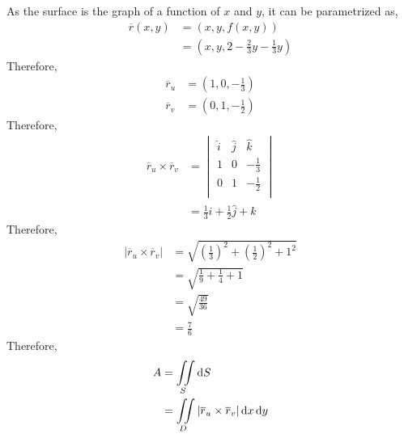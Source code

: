 \documentclass[fleqn, a4paper, 12pt, twoside]{article}
\theoremstyle{definition}
\theoremstyle{theorem}
\begin{document}
\begin{solution}
\begin{figure}[H]
	\end{figure}
	As the surface is the graph of a function of $x$ and $y$, it can be parametrized as,
	\begin{align*}
		\overline{r}(x,y) & = \left( x , y , f(x,y) \right)\\
                                  & = \left( x , y , 2 - \frac{2}{3} y - \frac{1}{3} y \right)
	\end{align*}
	Therefore,
	\begin{align*}
		\overline{r}_u & = \left( 1 , 0 , -\frac{1}{3} \right) \\
		\overline{r}_v & = \left( 0 , 1 , -\frac{1}{2} \right)
	\end{align*}
	Therefore,
	\begin{align*}
		\overline{r}_u \times \overline{r}_v &=
			\begin{vmatrix}
				\hat{i} & \hat{j} & \hat{k}      \\
				1       & 0       & -\frac{1}{3} \\
				0       & 1       & -\frac{1}{2} \\
			\end{vmatrix}\\
		&= \frac{1}{3} \hat{i} + \frac{1}{2} \hat{j} + \hat{k}
	\end{align*}
	Therefore,
	\begin{align*}
		\left| \overline{r}_u \times \overline{r}_v \right| & = \sqrt{\left( \frac{1}{3} \right)^2 + \left( \frac{1}{2} \right)^2 + 1^2} \\
                                                                    & = \sqrt{\frac{1}{9} + \frac{1}{4} + 1}                                     \\
                                                                    & = \sqrt{\frac{49}{36}}                                                     \\
                                                                    & = \frac{7}{6}
	\end{align*}
	Therefore,
	\begin{align*}
		A & = \iint\limits_{S} \dif S                                                           \\
                  & = \iint\limits_{D} \left| \overline{r}_u \times\overline{r}_v \right| \dif x \dif y \\

\end{align*}
\end{solution}
\end{document}
